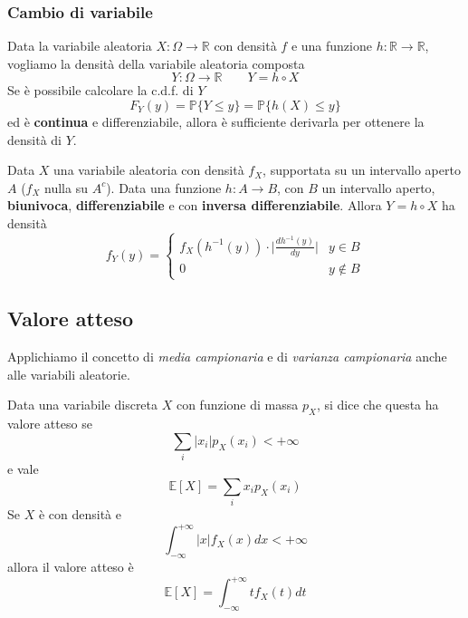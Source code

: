 \subsubsection{Cambio di variabile}
Data la variabile aleatoria $X: \Omega \to \mathbb{R}$ con densità $f$ e una funzione $h: \mathbb{R} \to \mathbb{R}$, vogliamo la densità della variabile aleatoria composta 
\begin{equation*}
	Y: \Omega \to \mathbb{R} \quad\quad Y=h \circ X
\end{equation*}
Se è possibile calcolare la c.d.f. di $Y$
\begin{equation*}
	F_Y(y)=\mathbb{P}\{Y \leq y\} = \mathbb{P}\{h(X) \leq y\}
\end{equation*}
ed è \textbf{continua} e differenziabile, allora è sufficiente derivarla per ottenere la densità di $Y$.
\begin{proposition}
	Data $X$ una variabile aleatoria con densità $f_X$, supportata su un intervallo aperto $A$ ($f_X$ nulla su $A^c$). Data una funzione $h: A \to B$, con $B$ un intervallo aperto, \textbf{biunivoca}, \textbf{differenziabile} e con \textbf{inversa differenziabile}. Allora $Y = h \circ X$ ha densità
	\begin{equation}
		f_Y(y)=\begin{cases}
			f_X(h^{-1}(y)) \cdot \bigg\lvert \frac{dh^{-1}(y)}{dy}\bigg\rvert & y \in B\\
			0 & y \notin B
		\end{cases}
	\end{equation}
\end{proposition}

\subsection{Valore atteso}
Applichiamo il concetto di \textit{media campionaria} e di \textit{varianza campionaria} anche alle variabili aleatorie.
\begin{definition}
	Data una variabile discreta $X$ con funzione di massa $p_X$, si dice che questa ha valore atteso se
	\begin{equation*}
		\sum_{i}\lvert x_i \rvert p_X(x_i) < +\infty
	\end{equation*}
	e vale
	\begin{equation}
		\mathbb{E}[X]=\sum_{i}x_ip_X(x_i)
	\end{equation}
	Se $X$ è con densità e
	\begin{equation*}
		\int_{-\infty}^{+\infty} \lvert x \rvert f_X(x) dx < + \infty
	\end{equation*}
	allora il valore atteso è
	\begin{equation}
		\mathbb{E}[X]=\int_{-\infty}^{+\infty}t f_X(t)dt
	\end{equation}
\end{definition}

